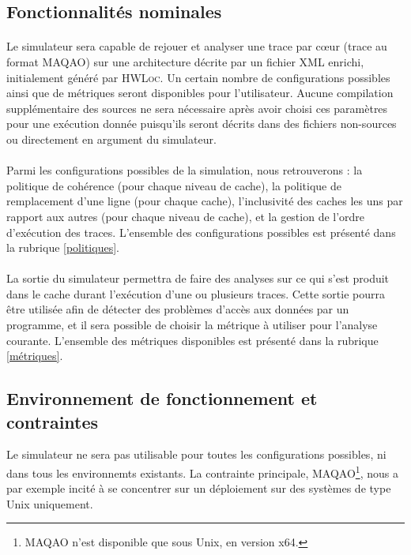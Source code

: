 \subsection{Fonctionnalités nominales}

\paragraph{}
Le simulateur sera capable de rejouer et analyser une trace par c\oe ur (trace au format \textsc{MAQAO}) sur une architecture décrite par un fichier XML enrichi, initialement généré par \textsc{HWLoc}. Un certain nombre de configurations possibles ainsi que de métriques seront disponibles pour l'utilisateur. Aucune compilation supplémentaire des sources ne sera nécessaire après avoir choisi ces paramètres pour une exécution donnée puisqu'ils seront décrits dans des fichiers non-sources ou directement en argument du simulateur. 

\paragraph{}
Parmi les configurations possibles de la simulation, nous retrouverons : la politique de cohérence (pour chaque niveau de cache), la politique de remplacement d'une ligne (pour chaque cache), l'inclusivité des caches les uns par rapport aux autres (pour chaque niveau de cache), et la gestion de l'ordre d'exécution des traces. L'ensemble des configurations possibles est présenté dans la rubrique \ref{politiques}.

\paragraph{}
La sortie du simulateur permettra de faire des analyses sur ce qui s'est produit dans le cache durant l'exécution d'une ou plusieurs traces. Cette sortie pourra être utilisée afin de détecter des problèmes d'accès aux données par un programme, et il sera possible de choisir la métrique à utiliser pour l'analyse courante. L'ensemble des métriques disponibles est présenté dans la rubrique \ref{métriques}. 

\newpage

\subsection{Environnement de fonctionnement et contraintes}

Le simulateur ne sera pas utilisable pour toutes les configurations possibles, ni dans tous les environnemts existants. La contrainte principale, \textsc{MAQAO}\footnote{MAQAO n'est disponible que sous Unix, en version x64.}, nous a par exemple incité à se concentrer sur un déploiement sur des systèmes de type Unix uniquement. 

